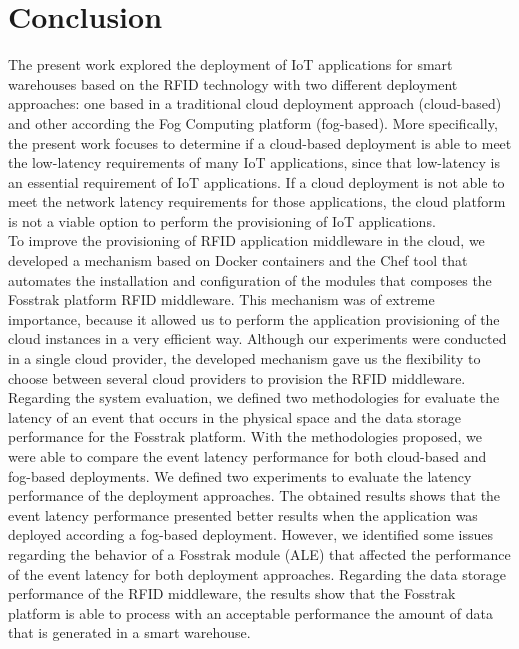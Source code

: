 
\chapter{Conclusion}
\label{chapter:conclusion}
The present work explored the deployment of \gls{IoT} applications for smart warehouses based on the
\gls{RFID} technology with two different deployment approaches: one based in a traditional cloud
deployment approach (cloud-based) and other according the Fog Computing platform (fog-based). More
specifically, the present work focuses to determine if a cloud-based deployment is able to meet the
low-latency requirements of many \gls{IoT} applications, since that low-latency is an essential
requirement of \gls{IoT} applications. If a cloud deployment is not able to meet the network latency
requirements for those applications, the cloud platform is not a viable option to perform the
provisioning of \gls{IoT} applications.\\

To improve the provisioning of \gls{RFID} application middleware in the cloud, we developed a mechanism based on
Docker containers and the Chef tool that automates the installation and configuration of the modules
that composes the Fosstrak platform \gls{RFID} middleware. This mechanism was of extreme
importance, because it allowed us to perform the application provisioning of the cloud instances in
a very efficient way. Although our experiments were conducted in a single cloud provider, the developed
mechanism gave us the flexibility to choose between several cloud providers to provision the
\gls{RFID} middleware.\\

Regarding the system evaluation, we defined two methodologies for evaluate the latency of an event that
occurs in the physical space and the data storage performance for the Fosstrak platform. With the
methodologies proposed, we were able to compare the event latency performance for both cloud-based
and fog-based deployments. We defined two experiments to evaluate the latency performance of the
deployment approaches. The obtained results shows that the event latency performance presented better
results when the application was deployed according a fog-based deployment. However, we identified
some issues regarding the behavior of a Fosstrak module (\gls{ALE}) that affected the performance
of the event latency for both deployment approaches. Regarding the data storage performance of the
RFID middleware, the results show that the Fosstrak platform is able to process with an acceptable
performance the amount of data that is generated in a smart warehouse.

